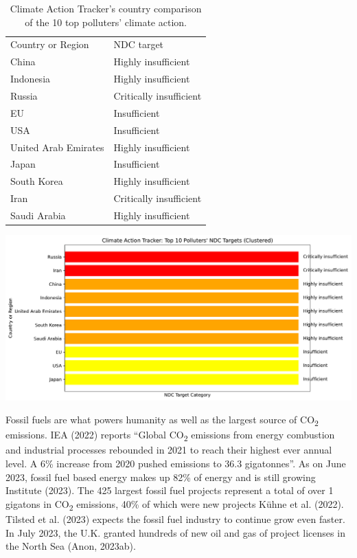 \documentclass[
  letterpaper,
  DIV=11,
  numbers=noendperiod]{scrartcl}
\begin{document}
\begin{longtable}[]{@{}ll@{}}
\caption{Climate Action Tracker's country comparison of the 10 top
polluters' climate action.}\tabularnewline
\toprule\noalign{}
\endfirsthead
\endhead
\bottomrule\noalign{}
\endlastfoot
Country or Region & NDC target \\
China & Highly insufficient \\
Indonesia & Highly insufficient \\
Russia & Critically insufficient \\
EU & Insufficient \\
USA & Insufficient \\
United Arab Emirates & Highly insufficient \\
Japan & Insufficient \\
South Korea & Highly insufficient \\
Iran & Critically insufficient \\
Saudi Arabia & Highly insufficient \\
\end{longtable}

\includegraphics{_thesis_files/figure-pdf/cell-12-output-1.pdf}

Fossil fuels are what powers humanity as well as the largest source of
CO\textsubscript{2} emissions. IEA (2022) reports ``Global
CO\textsubscript{2} emissions from energy combustion and industrial
processes rebounded in 2021 to reach their highest ever annual level. A
6\% increase from 2020 pushed emissions to 36.3 gigatonnes''. As on June
2023, fossil fuel based energy makes up 82\% of energy and is still
growing Institute (2023). The 425 largest fossil fuel projects represent
a total of over 1 gigatons in CO\textsubscript{2} emissions, 40\% of
which were new projects Kühne et al. (2022). Tilsted et al. (2023)
expects the fossil fuel industry to continue grow even faster. In July
2023, the U.K. granted hundreds of new oil and gas of project licenses
in the North Sea (Anon, 2023ab).
\end{document}
